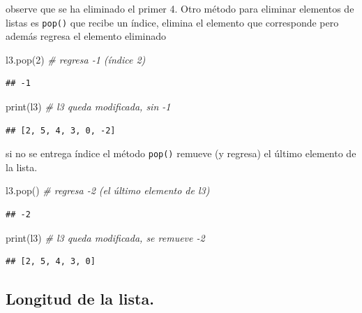 \documentclass[
]{book}
\newenvironment{Shaded}{\begin{snugshade}}{\end{snugshade}}
\newcommand{\BuiltInTok}[1]{#1}
\newcommand{\CommentTok}[1]{\textcolor[rgb]{0.56,0.35,0.01}{\textit{#1}}}
\newcommand{\DecValTok}[1]{\textcolor[rgb]{0.00,0.00,0.81}{#1}}
\newcommand{\NormalTok}[1]{#1}
\theoremstyle{definition}
\theoremstyle{definition}
\theoremstyle{definition}
\theoremstyle{definition}
\theoremstyle{remark}
\begin{document}
observe que se ha eliminado el primer 4. Otro método para eliminar elementos de listas es \texttt{pop()} que recibe un índice, elimina el elemento que corresponde pero además regresa el elemento eliminado

\begin{Shaded}
\begin{Highlighting}[]
\NormalTok{l3.pop(}\DecValTok{2}\NormalTok{) }\CommentTok{\# regresa {-}1 (índice 2)}
\end{Highlighting}
\end{Shaded}

\begin{verbatim}
## -1
\end{verbatim}

\begin{Shaded}
\begin{Highlighting}[]
\BuiltInTok{print}\NormalTok{(l3) }\CommentTok{\# l3 queda modificada, sin {-}1   }
\end{Highlighting}
\end{Shaded}

\begin{verbatim}
## [2, 5, 4, 3, 0, -2]
\end{verbatim}

si no se entrega índice el método \texttt{pop()} remueve (y regresa) el último elemento de la lista.

\begin{Shaded}
\begin{Highlighting}[]
\NormalTok{l3.pop()  }\CommentTok{\# regresa {-}2 (el último elemento de l3)}
\end{Highlighting}
\end{Shaded}

\begin{verbatim}
## -2
\end{verbatim}

\begin{Shaded}
\begin{Highlighting}[]
\BuiltInTok{print}\NormalTok{(l3) }\CommentTok{\# l3 queda modificada, se remueve {-}2   }
\end{Highlighting}
\end{Shaded}

\begin{verbatim}
## [2, 5, 4, 3, 0]
\end{verbatim}

\hypertarget{longitud-de-la-lista.}{%
\subsection{Longitud de la lista.}\label{longitud-de-la-lista.}}
\end{document}
